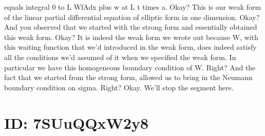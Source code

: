 \documentclass[10pt]{article}
\begin{document}
equals integral 0 to L WfAdx plus w at L t times a. Okay? This is our weak form of the linear partial differential equation of elliptic form in one dimension. Okay? And you observed that we started with the strong form and essentially obtained this weak form. Okay? It is indeed the weak form we wrote out because W, with this waiting function that we'd introduced in the weak form, does indeed satisfy all the conditions we'd assumed of it when we specified the weak form. In particular we have this homogeneous boundary condition of W. Right? And the fact that we started from the strong form, allowed us to bring in the Neumann boundary condition on sigma. Right? Okay. We'll stop the segment here.

\section*{ID: 7SUuQQxW2y8}
\end{document}
